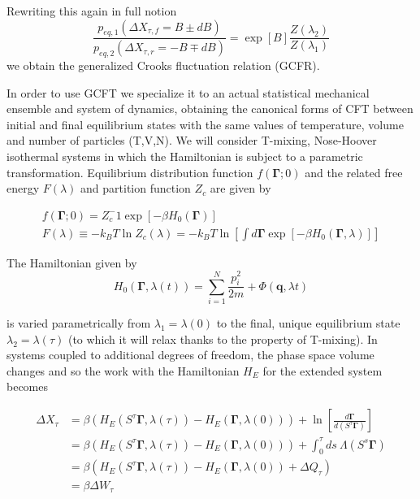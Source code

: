 \documentclass[a4paper,12pt,nofootinbib]{article}
\begin{document}
Rewriting this again in full notion
\begin{equation}
\label{GCFR}
\frac{p_{eq,1}(\Delta X_{\tau,f}=B\pm dB)}{p_{eq,2}(\Delta X_{\tau,r}=-B\mp dB)}= \exp[B] \frac{Z(\lambda_2)}{Z(\lambda_1)}
\end{equation}
we obtain the generalized Crooks fluctuation relation (GCFR).

In order to use GCFT we specialize it to an actual statistical mechanical ensemble and system of dynamics, obtaining the canonical forms of CFT between initial and final equilibrium states with the same values of temperature, volume and number of particles (T,V,N). We will consider T-mixing, Nose-Hoover isothermal systems in which the Hamiltonian is subject to a parametric transformation. Equilibrium distribution function $f(\bm{\Gamma};0)$ and the related free energy $F(\lambda)$ and partition function $Z_c$ are given by

\begin{equation}
\begin{aligned}
  f(\bm{\Gamma};0)=Z_c^-1 \exp[-\beta H_0(\bm{\Gamma})]\\
  F(\lambda)\equiv - k_B T \ln Z_c(\lambda) = -k_B T \ln[\int d\bm{\Gamma} \exp[-\beta H_0(\bm{\Gamma},\lambda)]]
\end{aligned}
\end{equation}

The Hamiltonian given by
\begin{equation}
  H_0(\bm{\Gamma},\lambda(t)) = \sum_{i=1}^N \frac{p_i^2}{2m} + \Phi(\bm{q}, \lambda{t})
\end{equation}

is varied parametrically from $\lambda_1 =\lambda(0)$ to the final, unique equilibrium state $\lambda_2 = \lambda(\tau)$ (to which it will relax thanks to the property of T-mixing). In systems coupled to additional degrees of freedom, the phase space volume changes and so the work with the Hamiltonian $H_E$ for the extended system becomes

\begin{equation}
\begin{aligned}
  \Delta X_\tau &= \beta ( H_E(S^\tau \bm{\Gamma}, \lambda(\tau))-H_E(\bm{\Gamma},\lambda(0))) + \ln\left[\frac{d\bm{\Gamma}}{d(S^\tau \bm{\Gamma})}\right]\\
  &=\beta ( H_E(S^\tau \bm{\Gamma}, \lambda(\tau))-H_E(\bm{\Gamma},\lambda(0))) + \int_0^\tau ds\ \Lambda(S^s\bm{\Gamma})\\
  &=\beta ( H_E(S^\tau \bm{\Gamma}, \lambda(\tau))-H_E(\bm{\Gamma},\lambda(0)) +\Delta Q_\tau) \\
  &=\beta \Delta W_\tau
\end{aligned}
\end{equation}
\end{document}
